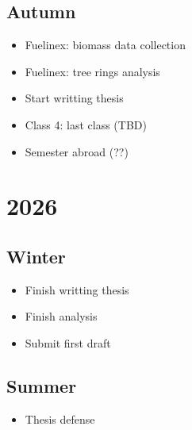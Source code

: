 \documentclass{article}
\begin{document}
\subsection {Autumn}
\begin {itemize}
	\item Fuelinex: biomass data collection
	\item Fuelinex: tree rings analysis 
	\item Start writting thesis 
	\item Class 4: last class (TBD)
	\item Semester abroad (??)
\end {itemize}

\section {2026}
\subsection {Winter}
\begin {itemize}
	\item Finish writting thesis
	\item Finish analysis
	\item Submit first draft
\end {itemize}

\subsection {Summer}
\begin {itemize}
	\item Thesis defense
\end {itemize}


\end{document}
